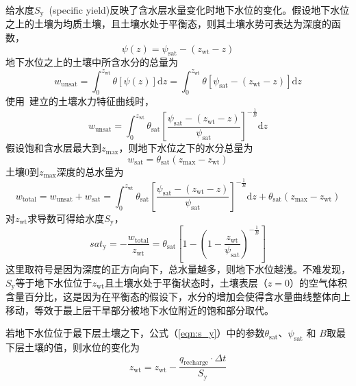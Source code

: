 给水度$S_{\mathrm {y}} $~(specific yield)反映了含水层水量变化时地下水位的变化。假设地下水位之上的土壤为均质土壤，且土壤水处于平衡态，则其土壤水势可表达为深度的函数，
\begin{equation}
  \psi \left(z\right) = \psi_{\mathrm {sat}}  - \left(z_{\mathrm{wt}} - z\right)
\end{equation}
地下水位之上的土壤中所含水分的总量为
\begin{equation}
  w_{\mathrm{unsat}} = \int^{z_{\mathrm{wt}}}_0 \theta\left[\psi\left(z\right)\right] \mathrm{d}z = \int^{z_{\mathrm{wt}}}_0 \theta\left[\psi_{\mathrm {sat}}  - \left(z_{\mathrm{wt}} - z\right)\right] \mathrm{d}z
\end{equation}
使用~\citet{campbell1974}建立的土壤水力特征曲线时，
\begin{equation}
  w_{\mathrm{unsat}} = \int^{z_{\mathrm{wt}}}_0 \theta_{\mathrm {sat}} \left[\frac{\psi_{\mathrm {sat}}  - \left(z_{\mathrm{wt}} - z\right)}{\psi_{\mathrm {sat}} }\right]^{-\frac{1}{B}} \mathrm{d}z
\end{equation}
假设饱和含水层最大到$z_{\mathrm{max}}$，则地下水位之下的水分总量为
\begin{equation}
  w_{\mathrm{sat}} = \theta_{\mathrm {sat}} \left(z_{\mathrm{max}}-z_{\mathrm{wt}}\right)
\end{equation}
土壤$0$到$z_{\mathrm{max}}$深度的总水量为
\begin{equation}
  w_{\mathrm{total}} = w_{\mathrm{unsat}} + w_{\mathrm{sat}} = \int^{z_{\mathrm{wt}}}_0 \theta_{\mathrm {sat}} \left[\frac{\psi_{\mathrm {sat}}  - \left(z_{\mathrm{wt}} - z\right)}{\psi_{\mathrm {sat}} }\right]^{-\frac{1}{B}} \mathrm{d}z + \theta_{\mathrm {sat}} \left(z_{\mathrm{max}}-z_{\mathrm{wt}}\right)
\end{equation}
对$z_{\mathrm{wt}}$求导数可得给水度$S_{\mathrm {y}} $，
\begin{equation}
  {sat}_{\mathrm{{y}}} = -\frac{w_{\mathrm{total}}}{z_{\mathrm{wt}}} = \theta_{\mathrm{sat}}\left[1-\left(1-\frac{z_{\mathrm{w t}}}{\psi_{\mathrm{sat}}}\right)^{-\frac{1}{B}}\right] \label{eqn:s_y}
\end{equation}
这里取符号是因为深度的正方向向下，总水量越多，则地下水位越浅。不难发现，$S_{\mathrm {y}} $等于地下水位位于$z_{\mathrm{wt}}$且土壤水处于平衡状态时，土壤表层（$z=0$）的空气体积含量百分比，这是因为在平衡态的假设下，水分的增加会使得含水量曲线整体向上移动，等效于最上层干旱部分被地下水位附近的饱和部分取代。

若地下水位位于最下层土壤之下，公式（\ref{eqn:s_y}）中的参数$\theta_{\mathrm {sat}} $、$\psi_{\mathrm {sat}} $ 和 $B$取最下层土壤的值，则水位的变化为
\begin{equation}
  z_{\mathrm{w t}}=z_{\mathrm{w t}}-\frac{q_{\mathrm{recharge}} \cdot \Delta t}{S_{\mathrm{y}}}
\end{equation}

